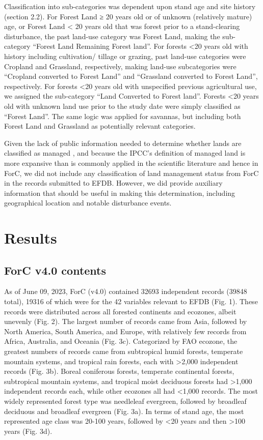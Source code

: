 \documentclass[, manuscript]{copernicus}
\begin{document}
Classification into sub-categories was dependent upon stand age and site
history (section 2.2). For Forest Land ≥ 20 years old or of unknown
(relatively mature) age, or Forest Land \textless{} 20 years old that
was forest prior to a stand-clearing disturbance, the past land-use
category was Forest Land, making the sub-category ``Forest Land
Remaining Forest land''. For forests \textless20 years old with history
including cultivation/ tillage or grazing, past land-use categories were
Cropland and Grassland, respectively, making land-use subcategories were
``Cropland converted to Forest Land'' and ``Grassland converted to
Forest Land'', respectively. For forests \textless20 years old with
unspecified previous agricultural use, we assigned the sub-category
``Land Converted to Forest land''. Forests \textless20 years old with
unknown land use prior to the study date were simply classified as
``Forest Land''. The same logic was applied for savannas, but including
both Forest Land and Grassland as potentially relevant categories.

Given the lack of public information needed to determine whether lands
are classified as managed
\citep{ogle_delineating_2018, deng_comparing_2021}, and because the
IPCC's definition of managed land is more expansive than is commonly
applied in the scientific literature and hence in ForC, we did not
include any classification of land management status from ForC in the
records submitted to EFDB. However, we did provide auxiliary information
that should be useful in making this determination, including
geographical location and notable disturbance events.

\section{Results}

\subsection{ForC v4.0 contents}

As of June 09, 2023, ForC (v4.0) contained 32693 independent records
(39848 total), 19316 of which were for the 42 variables relevant to EFDB
(Fig. 1). These records were distributed across all forested continents
and ecozones, albeit unevenly (Fig. 2). The largest number of records
came from Asia, followed by North America, South America, and Europe,
with relatively few records from Africa, Australia, and Oceania (Fig.
3c). Categorized by FAO ecozone, the greatest numbers of records came
from subtropical humid forests, temperate mountain systems, and tropical
rain forests, each with \textgreater2,000 independent records (Fig. 3b).
Boreal coniferous forests, temperate continental forests, subtropical
mountain systems, and tropical moist deciduous forests had
\textgreater1,000 independent records each, while other ecozones all had
\textless1,000 records. The most widely represented forest type was
needleleaf evergreen, followed by broadleaf deciduous and broadleaf
evergreen (Fig. 3a). In terms of stand age, the most represented age
class was 20-100 years, followed by \textless20 years and then
\textgreater100 years (Fig. 3d).
\end{document}
